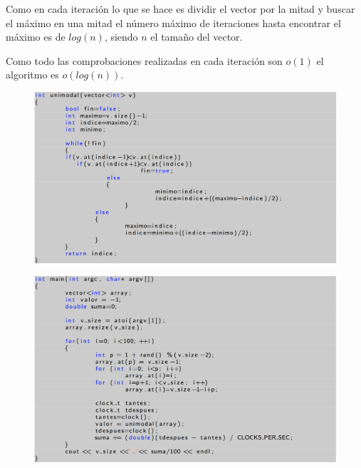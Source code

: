\documentclass[12pt]{beamer}
\begin{document}
\begin{frame}
Como en cada iteración lo que se hace es dividir el vector por la mitad y buscar el máximo en una mitad el número máximo de iteraciones hasta encontrar el máximo es de $log(n)$, siendo $n$ el tamaño del vector. 

\vspace{5mm} %

Como todo las comprobaciones realizadas en cada iteración son $o(1)$ el algoritmo es $o(log(n))$.
\end{frame}

\begin{frame}

\begin{figure}[H] 
\centering
\includegraphics[angle=0,scale=0.35]{img/1.png} 
\label{etiqueta} 
\end{figure}

\end{frame}

\begin{frame}

\begin{figure}[H] 
\centering
\includegraphics[angle=0,scale=0.35]{img/2.png} 
\label{etiqueta} 
\end{figure}

\end{frame}
\end{document}
